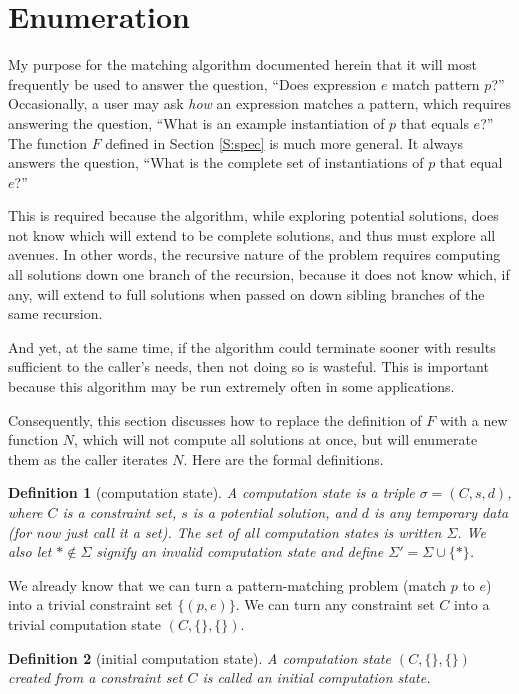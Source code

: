 \documentclass{article}
\newtheorem{dfn}{Definition}
\begin{document}
\section{Enumeration}%

My purpose for the matching algorithm documented herein that it will most frequently be used to answer the question, ``Does expression $e$ match pattern $p$?''  Occasionally, a user may ask \emph{how} an expression matches a pattern, which requires answering the question, ``What is an example instantiation of $p$ that equals $e$?''  The function $F$ defined in Section \ref{S:spec} is much more general.  It always answers the question, ``What is the complete set of instantiations of $p$ that equal $e$?''

This is required because the algorithm, while exploring potential solutions, does not know which will extend to be complete solutions, and thus must explore all avenues.  In other words, the recursive nature of the problem requires computing all solutions down one branch of the recursion, because it does not know which, if any, will extend to full solutions when passed on down sibling branches of the same recursion.

And yet, at the same time, if the algorithm could terminate sooner with results sufficient to the caller's needs, then not doing so is wasteful.  This is important because this algorithm may be run extremely often in some applications.

Consequently, this section discusses how to replace the definition of $F$ with a new function $N$, which will not compute all solutions at once, but will enumerate them as the caller iterates $N$.  Here are the formal definitions.

\begin{dfn}[computation state]
A \emph{computation state} is a triple $\sigma=(C,s,d)$, where $C$ is a constraint set, $s$ is a potential solution, and $d$ is any temporary data (for now just call it a set).  The set of all computation states is written $\Sigma$.  We also let $*\notin\Sigma$ signify an invalid computation state and define $\Sigma'=\Sigma\cup\{*\}$.
\end{dfn}

We already know that we can turn a pattern-matching problem (match $p$ to $e$) into a trivial constraint set $\{(p,e)\}$.  We can turn any constraint set $C$ into a trivial computation state $(C,\{\},\{\})$.

\begin{dfn}[initial computation state]
A computation state $(C,\{\},\{\})$ created from a constraint set $C$ is called an \emph{initial computation state.}
\end{dfn}
\end{document}
